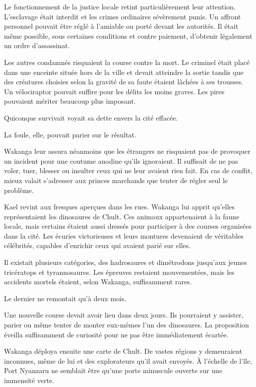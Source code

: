 Le fonctionnement de la justice locale retint particulièrement leur attention. L'esclavage était interdit et les crimes ordinaires sévèrement punis. Un affront personnel pouvait être réglé à l'amiable ou porté devant les autorités. Il était même possible, sous certaines conditions et contre paiement, d'obtenir légalement un ordre d'assassinat.

Les autres condamnés risquaient la course contre la mort. Le criminel était placé dans une enceinte située hors de la ville et devait atteindre la sortie tandis que des créatures choisies selon la gravité de sa faute étaient lâchées à ses trousses. Un vélociraptor pouvait suffire pour les délits les moins graves. Les pires pouvaient mériter beaucoup plus imposant.

Quiconque survivait voyait sa dette envers la cité effacée.

La foule, elle, pouvait parier sur le résultat.

Wakanga leur assura néanmoins que les étrangers ne risquaient pas de provoquer un incident pour une coutume anodine qu'ils ignoraient. Il suffisait de ne pas voler, tuer, blesser ou insulter ceux qui ne leur avaient rien fait. En cas de conflit, mieux valait s'adresser aux princes marchands que tenter de régler seul le problème.

Kael revint aux fresques aperçues dans les rues. Wakanga lui apprit qu'elles représentaient les dinosaures de Chult. Ces animaux appartenaient à la faune locale, mais certains étaient aussi dressés pour participer à des courses organisées dans la cité. Les écuries victorieuses et leurs montures devenaient de véritables célébrités, capables d'enrichir ceux qui avaient parié sur elles.

Il existait plusieurs catégories, des hadrosaures et dimétrodons jusqu'aux jeunes tricératops et tyrannosaures. Les épreuves restaient mouvementées, mais les accidents mortels étaient, selon Wakanga, suffisamment rares.

Le dernier ne remontait qu'à deux mois.

Une nouvelle course devait avoir lieu dans deux jours. Ils pourraient y assister, parier ou même tenter de monter eux-mêmes l'un des dinosaures. La proposition éveilla suffisamment de curiosité pour ne pas être immédiatement écartée.

\scenebreak

Wakanga déploya ensuite une carte de Chult. De vastes régions y demeuraient inconnues, même de lui et des explorateurs qu'il avait envoyés. À l'échelle de l'île, Port Nyanzaru ne semblait être qu'une porte minuscule ouverte sur une immensité verte.

